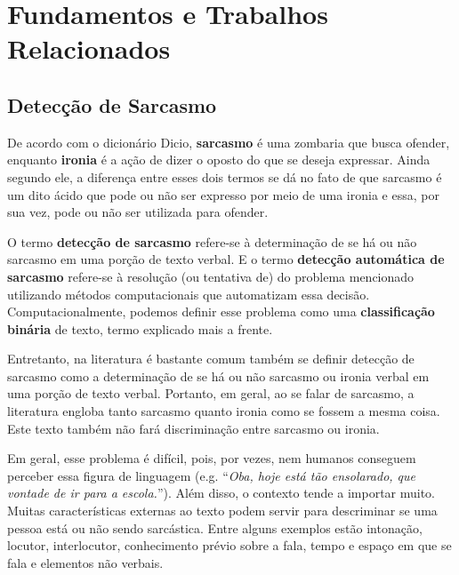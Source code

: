 

\chapter{Fundamentos e Trabalhos Relacionados}%
\label{cha:fundamentos_e_trabalhos_relacionados}

\section{Detecção de Sarcasmo}%
\label{sec:deteccao_de_sarcasmo}

De acordo com o dicionário Dicio, \textbf{sarcasmo} é uma zombaria que busca
ofender, enquanto \textbf{ironia} é a ação de dizer o oposto do que se deseja
expressar. Ainda segundo ele, a diferença entre esses dois termos se dá no fato
de que sarcasmo é um dito ácido que pode ou não ser expresso por meio de uma
ironia e essa, por sua vez, pode ou não ser utilizada para
ofender.~\cite{dicio_sarc, dicio_irony}

O termo \textbf{detecção de sarcasmo} refere-se à determinação de se há ou não
sarcasmo em uma porção de texto verbal. E o termo \textbf{detecção automática de
sarcasmo} refere-se à resolução (ou tentativa de) do problema mencionado
utilizando métodos computacionais que automatizam essa decisão.
Computacionalmente, podemos definir esse problema como uma \textbf{classificação
binária} de texto, termo explicado mais a frente.

Entretanto, na literatura é bastante comum também se definir detecção de
sarcasmo como a determinação de se há ou não sarcasmo ou ironia verbal em uma
porção de texto verbal. Portanto, em geral, ao se falar de sarcasmo, a
literatura engloba tanto sarcasmo quanto ironia como se fossem a mesma coisa.
Este texto também não fará discriminação entre sarcasmo ou ironia.

Em geral, esse problema é difícil, pois, por vezes, nem humanos conseguem
perceber essa figura de linguagem (e.g. ``\textit{Oba, hoje está tão ensolarado,
que vontade de ir para a escola.}''). Além disso, o contexto tende a importar
muito. Muitas características externas ao texto podem servir para descriminar se
uma pessoa está ou não sendo sarcástica. Entre alguns exemplos estão intonação,
locutor, interlocutor, conhecimento prévio sobre a fala, tempo e espaço em que
se fala e elementos não verbais.~\cite{wallace-etal:2014:ironic-context}

